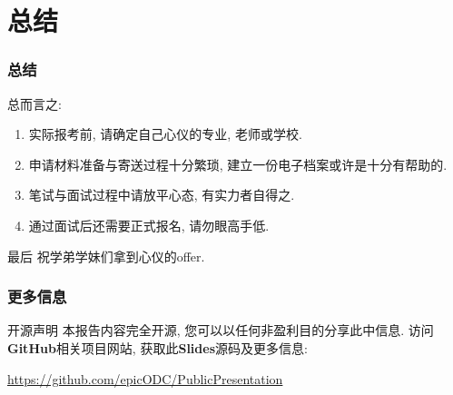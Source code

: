 \documentclass[usenames,dvipsnames]{beamer}
\begin{document}
    \section{总结}  

    \begin{frame}
      \frametitle{总结}
      总而言之:
      \begin{enumerate}[label=--]
        \item 实际报考前, 请确定自己心仪的专业, 老师或学校.
        \item 申请材料准备与寄送过程十分繁琐, 建立一份电子档案或许是十分有帮助的.
        \item 笔试与面试过程中请放平心态, 有实力者自得之.
        \item 通过面试后还需要正式报名, 请勿眼高手低.
      \end{enumerate}

      {
        \begin{block}{\small{最后}}
          祝学弟学妹们拿到心仪的offer.
        \end{block}
      }
    \end{frame}

    \begin{frame}
      \frametitle{更多信息}
      \begin{block}{开源声明}
        本报告内容完全开源, 您可以以任何非盈利目的分享此中信息. 访问\textbf{GitHub}相关项目网站, 获取此\textbf{Slides}源码及更多信息:
        
        \Large\url{https://github.com/epicODC/PublicPresentation}
      \end{block}
    \end{frame}
  
\end{document}
